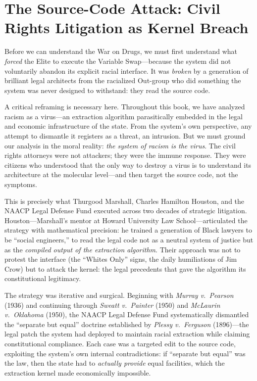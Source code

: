 \documentclass[12pt,openany]{book}
\begin{document}
\section{The Source-Code Attack: Civil Rights Litigation as Kernel Breach}

Before we can understand the War on Drugs, we must first understand what \textit{forced} the Elite to execute the Variable Swap---because the system did not voluntarily abandon its explicit racial interface. It was \textit{broken} by a generation of brilliant legal architects from the racialized Out-group who did something the system was never designed to withstand: they read the source code.

A critical reframing is necessary here. Throughout this book, we have analyzed racism as a virus---an extraction algorithm parasitically embedded in the legal and economic infrastructure of the state. From the system's own perspective, any attempt to dismantle it registers as a threat, an intrusion. But we must ground our analysis in the moral reality: \textit{the system of racism is the virus}. The civil rights attorneys were not attackers; they were the immune response. They were citizens who understood that the only way to destroy a virus is to understand its architecture at the molecular level---and then target the source code, not the symptoms.

This is precisely what Thurgood Marshall, Charles Hamilton Houston, and the NAACP Legal Defense Fund executed across two decades of strategic litigation. Houston---Marshall's mentor at Howard University Law School---articulated the strategy with mathematical precision: he trained a generation of Black lawyers to be ``social engineers,'' to read the legal code not as a neutral system of justice but as the \textit{compiled output of the extraction algorithm}. Their approach was not to protest the interface (the ``Whites Only'' signs, the daily humiliations of Jim Crow) but to attack the kernel: the legal precedents that gave the algorithm its constitutional legitimacy.

The strategy was iterative and surgical. Beginning with \textit{Murray v.\ Pearson} (1936) and continuing through \textit{Sweatt v.\ Painter} (1950) and \textit{McLaurin v.\ Oklahoma} (1950), the NAACP Legal Defense Fund systematically dismantled the ``separate but equal'' doctrine established by \textit{Plessy v.\ Ferguson} (1896)---the legal patch the system had deployed to maintain racial extraction while claiming constitutional compliance. Each case was a targeted edit to the source code, exploiting the system's own internal contradictions: if ``separate but equal'' was the law, then the state had to \textit{actually provide} equal facilities, which the extraction kernel made economically impossible.
\end{document}
